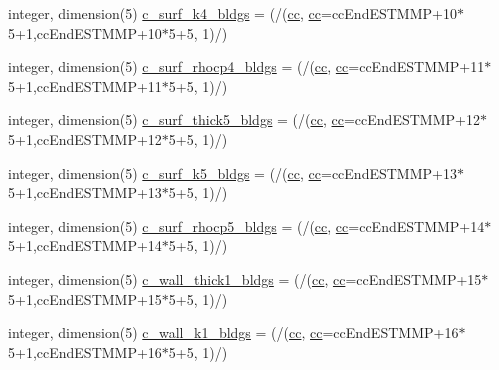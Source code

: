 \begin{DoxyCompactItemize}
\item 
integer, dimension(5) \hyperlink{namespaceallocatearray_ab35400b9c31346e3dd010b2e83f542be}{c\+\_\+surf\+\_\+k4\+\_\+bldgs} = (/(\hyperlink{namespaceallocatearray_ac863c81704eb507dee10f5e10741e10c}{cc}, \hyperlink{namespaceallocatearray_ac863c81704eb507dee10f5e10741e10c}{cc}=cc\+End\+E\+S\+T\+M\+MP+10$\ast$5+1,cc\+End\+E\+S\+T\+M\+MP+10$\ast$5+5, 1)/)
\item 
integer, dimension(5) \hyperlink{namespaceallocatearray_a35c52b98a58d78f88b187f33aed86b06}{c\+\_\+surf\+\_\+rhocp4\+\_\+bldgs} = (/(\hyperlink{namespaceallocatearray_ac863c81704eb507dee10f5e10741e10c}{cc}, \hyperlink{namespaceallocatearray_ac863c81704eb507dee10f5e10741e10c}{cc}=cc\+End\+E\+S\+T\+M\+MP+11$\ast$5+1,cc\+End\+E\+S\+T\+M\+MP+11$\ast$5+5, 1)/)
\item 
integer, dimension(5) \hyperlink{namespaceallocatearray_aa1c4374aa923231385e3fa68751e42a0}{c\+\_\+surf\+\_\+thick5\+\_\+bldgs} = (/(\hyperlink{namespaceallocatearray_ac863c81704eb507dee10f5e10741e10c}{cc}, \hyperlink{namespaceallocatearray_ac863c81704eb507dee10f5e10741e10c}{cc}=cc\+End\+E\+S\+T\+M\+MP+12$\ast$5+1,cc\+End\+E\+S\+T\+M\+MP+12$\ast$5+5, 1)/)
\item 
integer, dimension(5) \hyperlink{namespaceallocatearray_a746e5ac0eb74cd9430f4a2b86879b70a}{c\+\_\+surf\+\_\+k5\+\_\+bldgs} = (/(\hyperlink{namespaceallocatearray_ac863c81704eb507dee10f5e10741e10c}{cc}, \hyperlink{namespaceallocatearray_ac863c81704eb507dee10f5e10741e10c}{cc}=cc\+End\+E\+S\+T\+M\+MP+13$\ast$5+1,cc\+End\+E\+S\+T\+M\+MP+13$\ast$5+5, 1)/)
\item 
integer, dimension(5) \hyperlink{namespaceallocatearray_a32c00f0a86e011490cbd416daad75789}{c\+\_\+surf\+\_\+rhocp5\+\_\+bldgs} = (/(\hyperlink{namespaceallocatearray_ac863c81704eb507dee10f5e10741e10c}{cc}, \hyperlink{namespaceallocatearray_ac863c81704eb507dee10f5e10741e10c}{cc}=cc\+End\+E\+S\+T\+M\+MP+14$\ast$5+1,cc\+End\+E\+S\+T\+M\+MP+14$\ast$5+5, 1)/)
\item 
integer, dimension(5) \hyperlink{namespaceallocatearray_a1061e11bf9a6d6a6a63b9388a8a43270}{c\+\_\+wall\+\_\+thick1\+\_\+bldgs} = (/(\hyperlink{namespaceallocatearray_ac863c81704eb507dee10f5e10741e10c}{cc}, \hyperlink{namespaceallocatearray_ac863c81704eb507dee10f5e10741e10c}{cc}=cc\+End\+E\+S\+T\+M\+MP+15$\ast$5+1,cc\+End\+E\+S\+T\+M\+MP+15$\ast$5+5, 1)/)
\item 
integer, dimension(5) \hyperlink{namespaceallocatearray_a1777db63886a4bf072822bbc13c75d48}{c\+\_\+wall\+\_\+k1\+\_\+bldgs} = (/(\hyperlink{namespaceallocatearray_ac863c81704eb507dee10f5e10741e10c}{cc}, \hyperlink{namespaceallocatearray_ac863c81704eb507dee10f5e10741e10c}{cc}=cc\+End\+E\+S\+T\+M\+MP+16$\ast$5+1,cc\+End\+E\+S\+T\+M\+MP+16$\ast$5+5, 1)/)

\end{DoxyCompactItemize}
